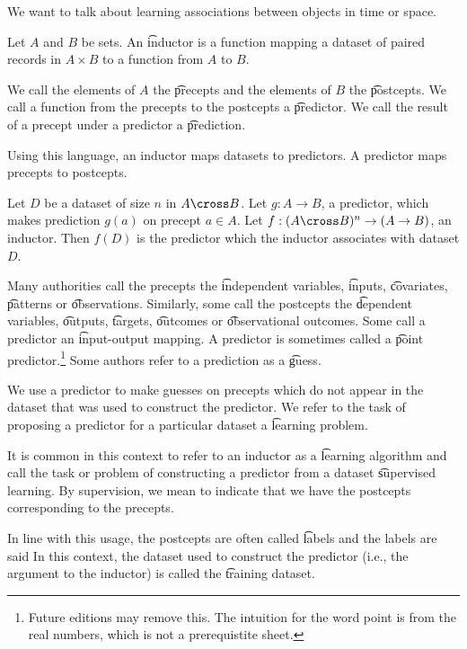 

We want to talk about learning
associations between objects
in time or space.


Let $A$ and $B$ be sets.
An \t{inductor} is a function mapping a dataset of paired records in $A \times B$ to a function from $A$ to $B$.

We call the elements of $A$ the \t{precepts} and the elements of $B$ the \t{postcepts}.
We call a function from the precepts to the postcepts a \t{predictor}.
We call the result of a precept under a predictor a \t{prediction}.

Using this language, an inductor maps datasets to predictors.
A predictor maps precepts to postcepts.


Let $D$ be a dataset of size $n$ in $A \cross B$.
Let $g: A \to B$, a predictor, which makes prediction $g(a)$ on precept $a \in A$.
Let $f: (A \cross B)^n \to (A \to B)$, an inductor.
Then $f(D)$ is the predictor which the inductor associates with dataset $D$.


Many authorities call the precepts the \t{independent variables}, \t{inputs}, \t{covariates}, \t{patterns} or \t{observations}.
Similarly, some call the postcepts the \t{dependent variables}, \t{outputs}, \t{targets}, \t{outcomes} or \t{observational outcomes}.
Some call a predictor an \t{input-output} mapping.
A predictor is sometimes called a \t{point predictor}.\footnote{Future editions may remove this. The intuition for the word point is from the real numbers, which is not a prerequistite sheet.}
Some authors refer to a prediction as a \t{guess}.


We use a predictor to make guesses on precepts which do not appear in the dataset that was used to construct the predictor.
We refer to the task of proposing a predictor for a particular dataset a \t{learning problem}.

It is common in this context to refer to an inductor as a \t{learning algorithm} and call the task or problem of constructing a predictor from a dataset  \t{supervised learning}.
By supervision, we mean to indicate that we have the postcepts corresponding to the precepts.

In line with this usage, the postcepts are often called \t{labels} and the labels are said 
In this context, the dataset used to construct the predictor (i.e., the argument to the inductor) is called the \t{training dataset}.
